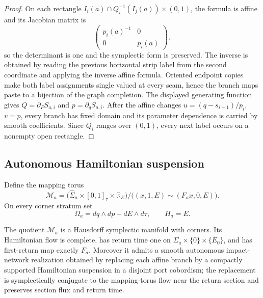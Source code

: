 \begin{proof}
On each rectangle
\(I_i(a)\cap Q_i^{-1}(I_j(a))\times(0,1)\), the formula is affine and its
Jacobian matrix is
\[
\begin{pmatrix}p_i(a)^{-1}&0\\0&p_i(a)\end{pmatrix},
\]
so the determinant is one and the symplectic form is preserved.  The inverse
is obtained by reading the previous horizontal strip label from the second
coordinate and applying the inverse affine formula.  Oriented endpoint copies
make both label assignments single valued at every seam, hence the branch
maps paste to a bijection of the graph completion.  The displayed generating
function gives \(Q=\partial_PS_{a,i}\) and
\(p=\partial_qS_{a,i}\).  After the affine changes
\(u=(q-s_{i-1})/p_i\), \(v=p\), every branch has fixed domain and its
parameter dependence is carried by smooth coefficients.  Since \(Q_i\)
ranges over \((0,1)\), every next label occurs on a nonempty open rectangle.
\end{proof}

\subsection{Autonomous Hamiltonian suspension}

Define the mapping torus
\[
\mathcal M_a=
\bigl(\widehat\Sigma_a\times[0,1]_\tau\times\mathbb R_E\bigr)
\big/\bigl((x,1,E)\sim(F_ax,0,E)\bigr).
\]
On every corner stratum set
\[
\Omega_a=dq\wedge dp+dE\wedge d\tau,
\qquad H_a=E.
\]

\begin{theorem}
\label{thm:r6-a1-suspension}
The quotient \(\mathcal M_a\) is a Hausdorff symplectic manifold with
corners.  Its Hamiltonian flow is complete, has return time one on
\(\widehat\Sigma_a\times\{0\}\times\{E_0\}\), and has first-return map
exactly \(F_a\).  Moreover it admits a smooth autonomous impact-network
realization obtained by replacing each affine branch by a compactly supported
Hamiltonian suspension in a disjoint port cobordism; the replacement is
symplectically conjugate to the mapping-torus flow near the return section and
preserves section flux and return time.
\end{theorem}

